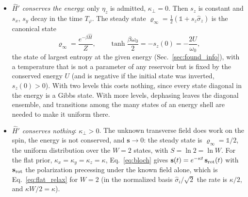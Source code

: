 \documentclass[10pt,a4paper]{article}
\begin{document}
\begin{itemize}
\item \emph{$ \hat H' $ conserves the energy}: only $ \eta_z $ is admitted, $ \kappa_\perp = 0 $. Then $ s_z $ is constant and $ s_x $, $ s_y $ decay in the time $ T_\varphi $. The steady state $ \varrho_\infty = \tfrac12(\mathbb{1} + s_z\hat\sigma_z) $ is the canonical state
  \[
    \varrho_\infty = \frac{e^{-\beta\hat H}}{Z} , \qquad
    \tanh\frac{\beta\omega_0}{2} = -s_z(0) = -\frac{2U}{\omega_0} ,
  \]
the state of largest entropy at the given energy (Sec.~\ref{sec:found_info}), with a temperature that is not a parameter of any reservoir but is fixed by the conserved energy $ U $ (and is negative if the initial state was inverted, $ s_z(0) > 0 $).
With two levels this costs nothing, since every state diagonal in the energy is a Gibbs state.
With more levels, dephasing leaves the diagonal ensemble, and transitions among the many states of an energy shell are needed to make it uniform there.
\item \emph{$ \hat H' $ conserves nothing}: $ \kappa_\perp > 0 $. The unknown transverse field does work on the spin, the energy is not conserved, and $ \mathbf{s} \to 0 $: the steady state is $ \varrho_\infty = \mathbb{1}/2 $, the uniform distribution over the $ W = 2 $ states, with $ S = \ln2 = \ln W $. For the flat prior, $ \kappa_x = \kappa_y = \kappa_z = \kappa $, Eq.~\eqref{eq:bloch} gives $ \mathbf{s}(t) = e^{-\kappa t}\,\mathbf{s}_{\rm rot}(t) $ with $ \mathbf{s}_{\rm rot} $ the polarization precessing under the known field alone, which is Eq.~\eqref{eq:flat_relax} for $ W = 2 $ (in the normalized basis $ \hat\sigma_i/\sqrt2 $ the rate is $ \kappa/2 $, and $ \kappa W/2 = \kappa $).
\end{itemize}
\end{document}
